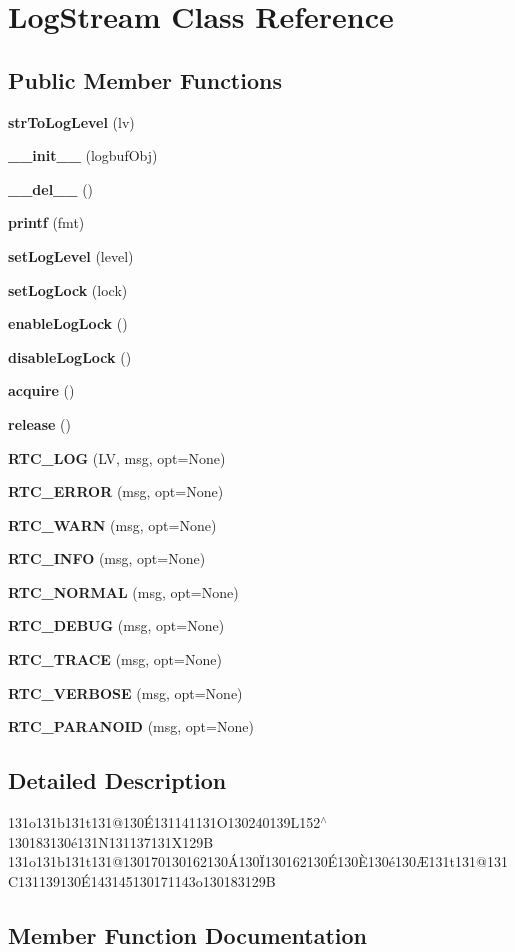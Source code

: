 \section{Log\-Stream Class Reference}
\label{classLogStream}
\subsection*{Public Member Functions}
\begin{CompactItemize}
\item 
{\bf str\-To\-Log\-Level} (lv)
\item 
{\bf \_\-\_\-init\_\-\_\-} (logbuf\-Obj)
\item 
{\bf \_\-\_\-del\_\-\_\-} ()
\item 
{\bf printf} (fmt)
\item 
{\bf set\-Log\-Level} (level)
\item 
{\bf set\-Log\-Lock} (lock)
\item 
{\bf enable\-Log\-Lock} ()
\item 
{\bf disable\-Log\-Lock} ()
\item 
{\bf acquire} ()
\item 
{\bf release} ()
\item 
{\bf RTC\_\-LOG} (LV, msg, opt=None)
\item 
{\bf RTC\_\-ERROR} (msg, opt=None)
\item 
{\bf RTC\_\-WARN} (msg, opt=None)
\item 
{\bf RTC\_\-INFO} (msg, opt=None)
\item 
{\bf RTC\_\-NORMAL} (msg, opt=None)
\item 
{\bf RTC\_\-DEBUG} (msg, opt=None)
\item 
{\bf RTC\_\-TRACE} (msg, opt=None)
\item 
{\bf RTC\_\-VERBOSE} (msg, opt=None)
\item 
{\bf RTC\_\-PARANOID} (msg, opt=None)
\end{CompactItemize}


\subsection{Detailed Description}
131o131b131t131@130\'{E}131141131O130240139L152$^\wedge$130183130\'{e}131N131137131X129B 131o131b131t131@130170130162130\'{A}130\"{I}130162130\'{E}130\`{E}130\'{e}130\AE{}131t131@131C131139130\'{E}143145130171143o130183129B



\subsection{Member Function Documentation}
